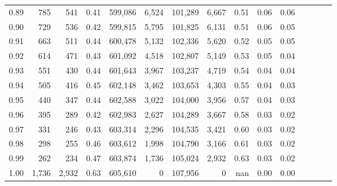 \begin{tabular}{rrrcrrrrrrrrrrr}
0.89 &     785 &    541 &                                       0.41 &  599,086 &    6,524 &  101,289 &    6,667 &  0.51 &  0.06 &                         0.06 \\
0.90 &     729 &    536 &                                       0.42 &  599,815 &    5,795 &  101,825 &    6,131 &  0.51 &  0.06 &                         0.05 \\
0.91 &     663 &    511 &                                       0.44 &  600,478 &    5,132 &  102,336 &    5,620 &  0.52 &  0.05 &                         0.05 \\
0.92 &     614 &    471 &                                       0.43 &  601,092 &    4,518 &  102,807 &    5,149 &  0.53 &  0.05 &                         0.04 \\
0.93 &     551 &    430 &                                       0.44 &  601,643 &    3,967 &  103,237 &    4,719 &  0.54 &  0.04 &                         0.04 \\
0.94 &     505 &    416 &                                       0.45 &  602,148 &    3,462 &  103,653 &    4,303 &  0.55 &  0.04 &                         0.03 \\
0.95 &     440 &    347 &                                       0.44 &  602,588 &    3,022 &  104,000 &    3,956 &  0.57 &  0.04 &                         0.03 \\
0.96 &     395 &    289 &                                       0.42 &  602,983 &    2,627 &  104,289 &    3,667 &  0.58 &  0.03 &                         0.02 \\
0.97 &     331 &    246 &                                       0.43 &  603,314 &    2,296 &  104,535 &    3,421 &  0.60 &  0.03 &                         0.02 \\
0.98 &     298 &    255 &                                       0.46 &  603,612 &    1,998 &  104,790 &    3,166 &  0.61 &  0.03 &                         0.02 \\
0.99 &     262 &    234 &                                       0.47 &  603,874 &    1,736 &  105,024 &    2,932 &  0.63 &  0.03 &                         0.02 \\
1.00 &   1,736 &  2,932 &                                       0.63 &  605,610 &        0 &  107,956 &        0 &   nan &  0.00 &                         0.00 \\
\bottomrule
\end{tabular}
